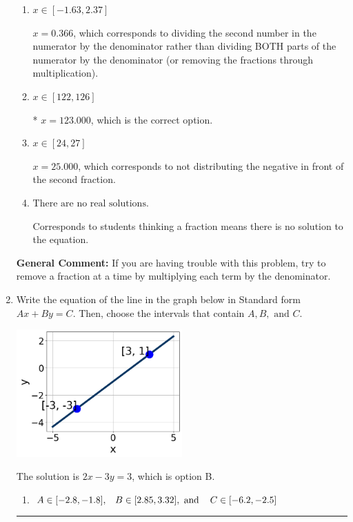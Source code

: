 \documentclass{extbook}[14pt]
\newcommand{\litem}[1]{\item #1

\rule{\textwidth}{0.4pt}}
\begin{document}
\begin{enumerate}
{\begin{enumerate}[label=\Alph*.]
 $x = 420.000$, which corresponds to dividing the coefficients in front of x by the denominator rather than dividing BOTH parts of the numerator by the denominator (or removing the fractions through multiplication).
\item \( x \in [-1.63, 2.37] \)

 $x = 0.366$, which corresponds to dividing the second number in the numerator by the denominator rather than dividing BOTH parts of the numerator by the denominator (or removing the fractions through multiplication).
\item \( x \in [122, 126] \)

* $x = 123.000$, which is the correct option.
\item \( x \in [24, 27] \)

 $x = 25.000$, which corresponds to not distributing the negative in front of the second fraction.
\item \( \text{There are no real solutions.} \)

Corresponds to students thinking a fraction means there is no solution to the equation.
\end{enumerate}

\textbf{General Comment:} If you are having trouble with this problem, try to remove a fraction at a time by multiplying each term by the denominator.
}
\litem{
Write the equation of the line in the graph below in Standard form $Ax+By=C$. Then, choose the intervals that contain $A, B, \text{ and } C$.

\begin{center}
    \includegraphics[width=0.5\textwidth]{../Figures/linearGraphToStandardCopyC.png}
\end{center}



The solution is \( 2x - 3y = 3 \), which is option B.\begin{enumerate}[label=\Alph*.]
\item \( A \in [-2.8, -1.8], \hspace{3mm} B \in [2.85, 3.32], \text{ and } \hspace{3mm} C \in [-6.2, -2.5] \)


\end{enumerate}}
\end{enumerate}
\end{document}
